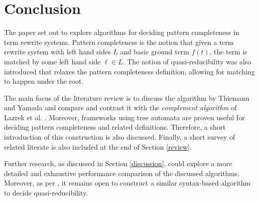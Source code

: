 \section{Conclusion} \label{conclusion}
The paper set out to explore algorithms for deciding pattern completeness in term rewrite systems. Pattern completeness is the notion that given a term rewrite system with left hand sides $L$ and basic ground term $f(t)$, the term is matched by some left hand side $\ell \in L$. The notion of quasi-reducibility was also introduced that relaxes the pattern completeness definition, allowing for matching to happen under the root.

The main focus of the literature review is to discuss the algorithm by Thiemann and Yamada\cite{thiemann} and compare and contrast it with the \textit{complement algorithm} of Lazrek et al. \cite{lazrek}. Moreover, frameworks using tree automata are proven useful for deciding pattern completeness and related definitions. Therefore, a short introduction of this construction is also discussed. Finally, a short survey of related literate is also included at the end of Section \ref{review}.

Further research, as discussed in Section \ref{discussion}, could explore a more detailed and exhaustive performance comparison of the discussed algorithms. Moreover, as per \cite{thiemann}, it remains open to construct a similar syntax-based algorithm to decide quasi-reducibility.
